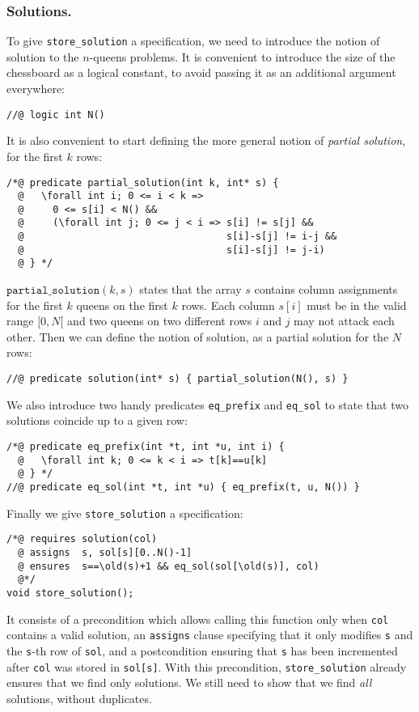 \documentclass[a4paper]{llncs}
\begin{document}
\subsubsection{Solutions.}
To give \texttt{store\_solution} a specification, we need to introduce
the notion of solution to the $n$-queens problems. It is convenient to
introduce the size of the chessboard as a logical constant, to avoid
passing it as an additional argument everywhere:
\begin{verbatim}
//@ logic int N()
\end{verbatim}
It is also convenient to start defining the more general notion of
\emph{partial solution}, for the first $k$ rows:
\begin{verbatim}
/*@ predicate partial_solution(int k, int* s) {
  @   \forall int i; 0 <= i < k => 
  @     0 <= s[i] < N() &&
  @     (\forall int j; 0 <= j < i => s[i] != s[j] &&
  @                                   s[i]-s[j] != i-j &&
  @                                   s[i]-s[j] != j-i)
  @ } */
\end{verbatim}
$\mathtt{partial\_solution}(k,s)$ states that the array $s$ contains
column assignments for the first $k$ queens on the first $k$
rows. Each column $s[i]$ must be in the valid range $[0,N[$ and two
queens on two different rows $i$ and $j$ may not attack each other.
Then we can define the notion of solution, as a partial solution for
the $N$ rows:
\begin{verbatim}
//@ predicate solution(int* s) { partial_solution(N(), s) }
\end{verbatim}
We also introduce two handy predicates \texttt{eq\_prefix} and
\texttt{eq\_sol} to state that two solutions coincide up to a given row:
\begin{verbatim}
/*@ predicate eq_prefix(int *t, int *u, int i) {
  @   \forall int k; 0 <= k < i => t[k]==u[k]
  @ } */
//@ predicate eq_sol(int *t, int *u) { eq_prefix(t, u, N()) } 
\end{verbatim}
Finally we give \texttt{store\_solution} a specification:
\begin{verbatim}
/*@ requires solution(col)
  @ assigns  s, sol[s][0..N()-1]
  @ ensures  s==\old(s)+1 && eq_sol(sol[\old(s)], col)
  @*/
void store_solution();
\end{verbatim}
It consists of a precondition which allows calling this function only when
\texttt{col} contains a valid solution, an \texttt{assigns} clause
specifying that it only modifies \texttt{s} and the \texttt{s}-th row
of \texttt{sol}, and a postcondition ensuring that \texttt{s} has been
incremented after \texttt{col} was stored in \verb!sol[s]!.
With this precondition, \texttt{store\_solution} already ensures that
we find only solutions. We still need to show that we find \emph{all}
solutions, without duplicates.
\end{document}
